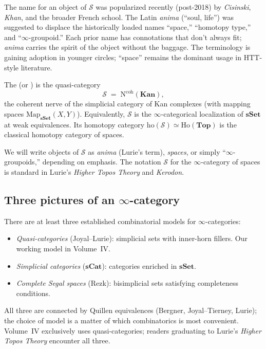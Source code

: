 \begin{nameorigin}
The name  for an object of $\mathcal{S}$ was popularized
recently (post-2018) by \emph{Cisinski}, \emph{Khan}, and the broader
French school. The Latin \emph{anima} (``soul, life'') was suggested
to displace the historically loaded names ``space,'' ``homotopy type,''
and ``$\infty$-groupoid.'' Each prior name has connotations that don't
always fit; \emph{anima} carries the spirit of the object without the
baggage. The terminology is gaining adoption in younger circles; ``space''
remains the dominant usage in HTT-style literature.
\end{nameorigin}

\begin{example_thm}
\label{ex:infty-spaces}
The  (or ) is the
quasi-category
\begin{equation*}
  \mathcal{S} \;=\; \mathrm{N}^{\mathrm{coh}}(\mathbf{Kan}),
\end{equation*}
the coherent nerve of the simplicial category of Kan complexes (with
mapping spaces $\mathrm{Map}_{\mathbf{sSet}}(X, Y)$). Equivalently,
$\mathcal{S}$ is the $\infty$-categorical localization of $\mathbf{sSet}$
at weak equivalences. Its homotopy category $\mathrm{ho}(\mathcal{S})
\simeq \mathrm{Ho}(\mathbf{Top})$ is the classical homotopy category of
spaces.
\end{example_thm}

\begin{remark}
We will write objects of $\mathcal{S}$ as \emph{anima} (Lurie's term),
\emph{spaces}, or simply ``$\infty$-groupoids,'' depending on emphasis.
The notation $\mathcal{S}$ for the $\infty$-category of spaces is
standard in Lurie's \emph{Higher Topos Theory} and \emph{Kerodon}.
\end{remark}

\subsection{Three pictures of an $\infty$-category}

\begin{remark}
There are at least three established combinatorial models for
$\infty$-categories:
\begin{itemize}
  \item \emph{Quasi-categories} (Joyal–Lurie): simplicial sets with
        inner-horn fillers. Our working model in Volume~IV.
  \item \emph{Simplicial categories} ($\mathbf{sCat}$): categories
        enriched in $\mathbf{sSet}$.
  \item \emph{Complete Segal spaces} (Rezk): bisimplicial sets satisfying
        completeness conditions.
\end{itemize}
All three are connected by Quillen equivalences (Bergner, Joyal–Tierney,
Lurie); the choice of model is a matter of which combinatorics is most
convenient. Volume~IV exclusively uses quasi-categories; readers
graduating to Lurie's \emph{Higher Topos Theory} encounter all three.
\end{remark}


